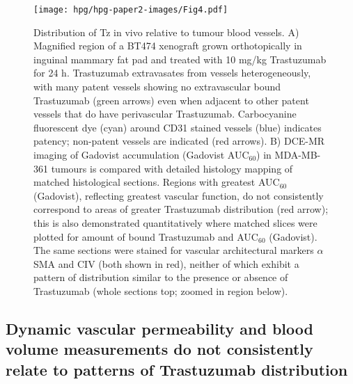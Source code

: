 \begin{figure}[htbp] %
  \centering
  \texttt{[image: hpg/hpg-paper2-images/Fig4.pdf]} 
  \captionsetup{width=1.2\linewidth}
  \caption{Distribution of Tz in vivo relative to tumour blood vessels. 
  A) Magnified region of a \acs{BT474} xenograft grown orthotopically in inguinal mammary fat pad and treated with 10 mg/kg Trastuzumab for 24 h. 
  Trastuzumab extravasates from vessels heterogeneously, with many patent vessels showing no extravascular bound Trastuzumab (green arrows) even when adjacent to other patent vessels that do have perivascular Trastuzumab. 
  Carbocyanine fluorescent dye (cyan) around CD31 stained vessels (blue) indicates patency; non-patent vessels are indicated (red arrows). 
  B) DCE-MR imaging of Gadovist accumulation (Gadovist \acs{AUC}$_60$) in \acs{MDA-MB-361} tumours is compared with detailed histology mapping of matched histological sections. 
  Regions with greatest \acs{AUC}$_60$ (Gadovist), reflecting greatest vascular function, do not consistently correspond to areas of greater Trastuzumab distribution (red arrow); this is also demonstrated quantitatively where matched slices were plotted for amount of bound Trastuzumab and \acs{AUC}$_60$ (Gadovist). 
  The same sections were stained for vascular architectural markers $\alpha$SMA and CIV (both shown in red), neither of which exhibit a pattern of distribution similar to the presence or absence of Trastuzumab (whole sections top; zoomed in region below).}
  \label{hpgpaper2:fig4}
\end{figure}

\subsection{Dynamic vascular permeability and blood volume measurements do not consistently relate to patterns of Trastuzumab distribution}

